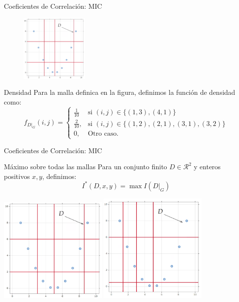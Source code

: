 \documentclass{beamer}
\begin{document}
\begin{frame}{Coeficientes de Correlación: MIC}
    \begin{figure}[H]
        \centering
        \includegraphics[width=0.3\textwidth]{mallaG4x3.png}
    \end{figure}
    \pause
    \begin{block}{Densidad}
        Para la malla definica en la figura, definimos la función de densidad como:
        \begin{equation*}
            f_{D|_G}(i,j) = \left\{\begin{array}{lr}
                \frac{1}{10} & \text{si } (i,j) \in \{ (1,3), (4,1)\} \\
                \frac{2}{10}, & \text{si }(i,j) \in \{ (1,2), (2,1), (3,1),(3,2)\}  \\
                0, & \text{Otro caso.}
                \end{array}\right.
        \end{equation*}
    \end{block}
\end{frame}


\begin{frame}{Coeficientes de Correlación: MIC}
    \begin{block}{Máximo sobre todas las mallas}
        Para un conjunto finito $D\in\mathcal{R}  ^2$ y enteros positivos $x,y$, definimos:
        $$
        I^*(D,x,y)=\max I(D|_G)
        $$
    \end{block}
    \pause
    \includegraphics[width=0.4\textwidth]{mallaG4x3.png}
    \hfill
    \includegraphics[width=0.4\textwidth]{mallaG4x3_2.png}
\end{frame}
\end{document}
